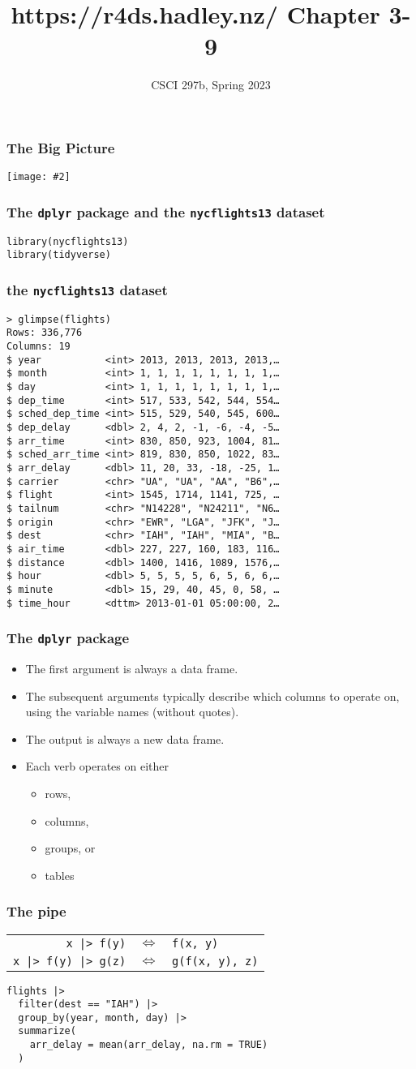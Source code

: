 \documentclass{beamer}
\title{{https://r4ds.hadley.nz/} Chapter 3-9}
\author{CSCI 297b, Spring 2023}
\newcommand{\bi}{\begin{itemize}}
\newcommand{\li}{\item}
\newcommand{\ei}{\end{itemize}}
\newcommand{\fig}[2]{\centerline{\texttt{[image: \#2]}}}
\newcommand{\bfr}[1]{\begin{frame}[fragile]\frametitle{{ #1 }}}
\begin{document}
\begin{frame}
\maketitle
\end{frame}

\bfr{The Big Picture}
\fig{1}{whole-game.png}
\end{frame}

\bfr{The {\tt dplyr} package and the {\tt nycflights13} dataset}

\begin{verbatim}
library(nycflights13)
library(tidyverse)
\end{verbatim}
\end{frame}

\bfr{the {\tt nycflights13} dataset}\scriptsize
\begin{verbatim}
> glimpse(flights)
Rows: 336,776
Columns: 19
$ year           <int> 2013, 2013, 2013, 2013,…
$ month          <int> 1, 1, 1, 1, 1, 1, 1, 1,…
$ day            <int> 1, 1, 1, 1, 1, 1, 1, 1,…
$ dep_time       <int> 517, 533, 542, 544, 554…
$ sched_dep_time <int> 515, 529, 540, 545, 600…
$ dep_delay      <dbl> 2, 4, 2, -1, -6, -4, -5…
$ arr_time       <int> 830, 850, 923, 1004, 81…
$ sched_arr_time <int> 819, 830, 850, 1022, 83…
$ arr_delay      <dbl> 11, 20, 33, -18, -25, 1…
$ carrier        <chr> "UA", "UA", "AA", "B6",…
$ flight         <int> 1545, 1714, 1141, 725, …
$ tailnum        <chr> "N14228", "N24211", "N6…
$ origin         <chr> "EWR", "LGA", "JFK", "J…
$ dest           <chr> "IAH", "IAH", "MIA", "B…
$ air_time       <dbl> 227, 227, 160, 183, 116…
$ distance       <dbl> 1400, 1416, 1089, 1576,…
$ hour           <dbl> 5, 5, 5, 5, 6, 5, 6, 6,…
$ minute         <dbl> 15, 29, 40, 45, 0, 58, …
$ time_hour      <dttm> 2013-01-01 05:00:00, 2…
\end{verbatim}
\end{frame}

\bfr{The {\tt dplyr} package}
\bi
\li The first argument is always a data frame.
\li
The subsequent arguments typically describe which columns to operate on, using the variable names (without quotes).
\li
The output is always a new data frame.
\li Each verb operates on either
\bi
\li rows,
\li columns,
\li groups, or 
\li tables
\ei
\ei
\end{frame}

\bfr{The pipe}
\begin{center}
\begin{tabular}{rcl}
\verb;x |> f(y); & $\Leftrightarrow$ & \verb;f(x, y);\\
\verb;x |> f(y) |> g(z); & $\Leftrightarrow$ & \verb;g(f(x, y), z);\\
\end{tabular}
\end{center}
\vfill

\begin{verbatim}
flights |>
  filter(dest == "IAH") |> 
  group_by(year, month, day) |> 
  summarize(
    arr_delay = mean(arr_delay, na.rm = TRUE)
  )
\end{verbatim}
\end{frame}
\end{document}

